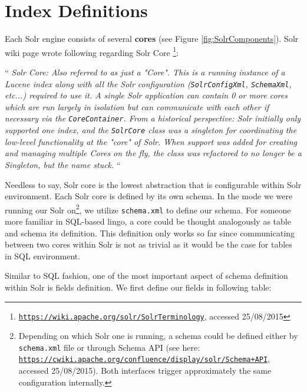 \section{Index Definitions}

Each Solr engine consists of several \textbf{cores} (see Figure \ref{fig:SolrComponents}). Solr wiki page wrote following regarding Solr Core \footnote{\href{https://wiki.apache.org/solr/SolrTerminology}{\texttt{https://wiki.apache.org/solr/SolrTerminology}}, accessed 25/08/2015}:

``
\textit{Solr Core: Also referred to as just a "Core". This is a running instance of a Lucene index along with all the Solr configuration (\texttt{SolrConfigXml}, \texttt{SchemaXml}, etc...) required to use it. A single Solr application can contain 0 or more cores which are run largely in isolation but can communicate with each other if necessary via the \texttt{CoreContainer}. From a historical perspective: Solr initially only supported one index, and the \texttt{SolrCore} class was a singleton for coordinating the low-level functionality at the "core" of Solr. When support was added for creating and managing multiple Cores on the fly, the class was refactored to no longer be a Singleton, but the name stuck.} 
``

Needless to say, Solr core is the lowest abstraction that is configurable within Solr environment. Each Solr core is defined by its own schema. In the mode we were running our Solr on\footnote{Depending on which Solr one is running, a schema could be defined either by \texttt{schema.xml} file or through Schema API (see here: \href{https://cwiki.apache.org/confluence/display/solr/Schema+API}{\texttt{https://cwiki.apache.org/confluence/display/solr/Schema+API}}, accessed 25/08/2015). Both interfaces trigger approximately the same configuration internally.}, we utilize \texttt{schema.xml} to define our schema. For someone more familiar in SQL-based lingo, a core could be thought analogously as table and schema its definition. This definition only works so far since communicating between two cores within Solr is not as trivial as it would be the case for tables in SQL environment.

Similar to SQL fashion, one of the most important aspect of schema definition within Solr is fields definition. We first define our fields in following table:

